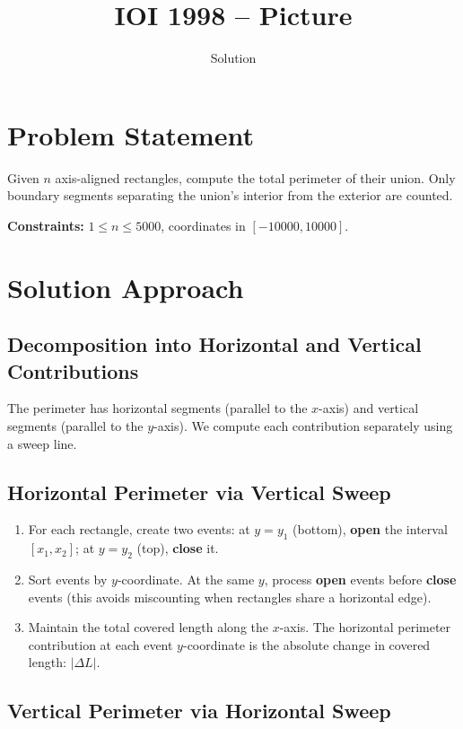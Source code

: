 \documentclass[11pt,a4paper]{article}
\title{IOI 1998 -- Picture}
\author{Solution}
\date{}
\begin{document}
\maketitle

\section{Problem Statement}

Given $n$ axis-aligned rectangles, compute the total perimeter of their union.
Only boundary segments separating the union's interior from the exterior are counted.

\medskip
\noindent\textbf{Constraints:} $1 \le n \le 5000$, coordinates in $[-10000, 10000]$.

\section{Solution Approach}

\subsection{Decomposition into Horizontal and Vertical Contributions}

The perimeter has horizontal segments (parallel to the $x$-axis) and vertical segments
(parallel to the $y$-axis). We compute each contribution separately using a sweep line.

\subsection{Horizontal Perimeter via Vertical Sweep}

\begin{enumerate}
  \item For each rectangle, create two events: at $y = y_1$ (bottom), \textbf{open} the
        interval $[x_1, x_2]$; at $y = y_2$ (top), \textbf{close} it.
  \item Sort events by $y$-coordinate. At the same $y$, process \textbf{open} events
        before \textbf{close} events (this avoids miscounting when rectangles share a
        horizontal edge).
  \item Maintain the total covered length along the $x$-axis. The horizontal perimeter
        contribution at each event $y$-coordinate is the absolute change in covered length:
        $|\Delta L|$.
\end{enumerate}

\subsection{Vertical Perimeter via Horizontal Sweep}
\end{document}
